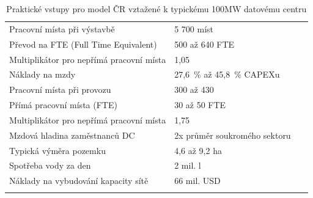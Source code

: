 \begin{landscape}
\begin{table}[p]
\begin{tabular}{llc}
        Pracovní místa při výstavbě & 5 700 míst &~\cite{to_albertas_2025} \\
        \quad Převod na FTE (Full Time Equivalent) & 500 až 640 FTE &~\cite{johnson_economics_economic_2025, lee_breaking_2025} \\
        \quad Multiplikátor pro nepřímá pracovní místa & 1,05 &~\cite{johnson_economics_economic_2025} \\
        \quad Náklady na mzdy & 27,6~\% až 45,8~\% CAPEXu &~\cite{to_albertas_2025,diao_economic_2025} \\
        Pracovní místa při provozu & 300 až 430 &~\cite{to_albertas_2025,diao_economic_2025} \\
        \quad Přímá pracovní místa (FTE) & 30 až 50 FTE &~\cite{to_albertas_2025,johnson_economics_economic_2025,diao_economic_2025, lee_breaking_2025} \\
        \quad Multiplikátor pro nepřímá pracovní místa & 1,75 &~\cite{johnson_economics_economic_2025} \\
        Mzdová hladina zaměstnanců DC & 2x průměr soukromého sektoru &~\cite{kshetri_data_2024} \\

        \addlinespace
        \midrule
        \addlinespace

        Typická výměra pozemku & 4,6 až 9,2 ha &~\cite{to_albertas_2025, roychoudhury_economic_2025} \\
        Spotřeba vody za den & 2 mil. l &~\cite{international_energy_agency_iea_energy_2025} \\
        Náklady na vybudování kapacity sítě & 66 mil. USD &~\cite{diao_economic_2025,davenport_ai_2024} \\

        \addlinespace
        \bottomrule
    \end{tabular}
    
    \caption{Praktické vstupy pro model ČR vztažené k typickému 100MW datovému centru}
    \label{tab:parametry_modelu_usa}

\end{table} \end{landscape}



